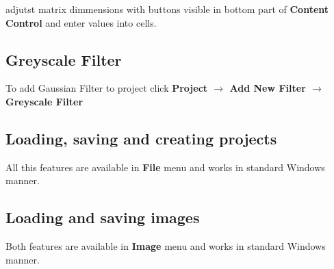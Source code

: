 \documentclass{article}
\begin{document}
adjutst matrix dimmensions with buttons visible in bottom part of \textbf{Content Control} and enter values into cells.

\subsection{Greyscale Filter}
To add Gaussian Filter to project click \textbf{Project $\rightarrow$ Add New Filter $\rightarrow$ Greyscale Filter}

\subsection{Loading, saving and creating projects}
All this features are available in \textbf{File} menu and works in standard Windows manner.

\subsection{Loading and saving images}
Both features are available in \textbf{Image} menu and works in standard Windows manner.
\end{document}
